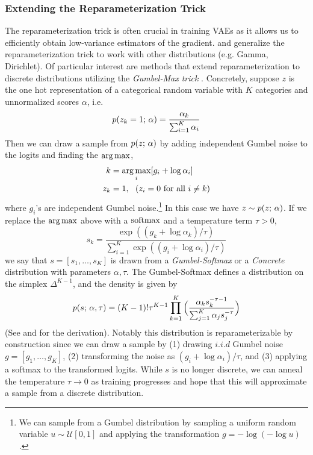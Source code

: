 \documentclass{article}
\begin{document}
\subsubsection{Extending the Reparameterization Trick}\label{reparam}
The reparameterization trick is often crucial in training VAEs as it allows us to efficiently
obtain low-variance estimators of the gradient.  
\cite{ruiz2016} and \cite{naesseth2017} generalize the reparameterization trick to work
with other distributions (e.g. Gamma, Dirichlet). Of particular interest are methods that
extend reparameterization to discrete distributions utilizing the \emph{Gumbel-Max trick}
\citep{Papandreou2011,hazan2012,Maddison2014}. Concretely, suppose $z$
is the one hot representation of a categorical random variable with $K$ categories and unnormalized
scores $\alpha$, i.e.
\[ p(z_k = 1 ; \, \alpha) = \frac{\alpha_k}{\sum_{i=1}^K \alpha_i}\]
Then we can draw a sample from $p(z ; \, \alpha)$ by 
adding independent Gumbel noise to the logits and finding the $\argmax$, 
\begin{align*}
    k &= \argmax_{i} [g_i + \log \alpha_i] \\
    z_k &= 1, \,\,\,\, (z_i = 0 \text{ for all } i \ne k)
\end{align*}
where $g_i$'s are independent Gumbel noise.\footnote{We can sample from a Gumbel distribution
by sampling a uniform random variable $u \sim \mathcal{U}[0,1]$ and applying the transformation $g = -\log (-\log u)$.} In this case we have $z \sim p(z ; \, \alpha)$. If we replace the $\argmax$ above with a $\operatorname*{softmax}$ and a temperature term $\tau > 0$, 
\[s_k =  \frac{\exp((g_k + \log \alpha_k)/\tau)}{\sum_{i=1}^K \exp((g_i + \log \alpha_i)/\tau)}\]
we say that $s = [s_1, \dots, s_K]$ is drawn from a \emph{Gumbel-Softmax} \citep{Jang2017} or a \emph{Concrete} \citep{Maddison2017} distribution with parameters $\alpha, \tau$.
The Gumbel-Softmax defines a distribution on the simplex $\Delta^{K-1}$, and the density is given by
\[ p(s ; \, \alpha, \tau) = ( K-1)! \tau^{K-1} \prod_{k=1}^K \Big( \frac{\alpha_k s_k^{-\tau - 1}}{\sum_{j=1}^K \alpha_j s_j^{-\tau} } \Big)\]
(See \cite{Jang2017} and \cite{Maddison2017} for the derivation).  Notably this distribution is reparameterizable by construction since we can draw a sample by (1)
drawing $i.i.d$ Gumbel noise $g = [g_1, \dots, g_K]$, (2) transforming the noise as $(g_i  + \log \alpha_i)/\tau$, and (3) applying a softmax to the transformed logits.
While $s$ is no longer discrete, we can anneal the temperature $\tau \rightarrow 0$ as training
progresses and hope that this will approximate a sample from a discrete distribution.
\end{document}
